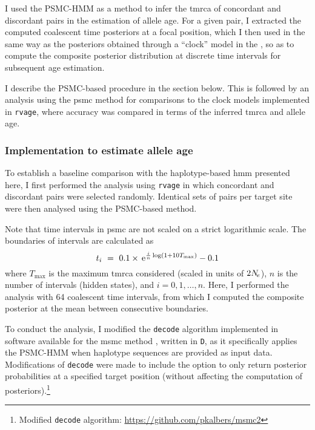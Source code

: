 I used the PSMC-HMM as a method to infer the \gls{tmrca} of concordant and discordant pairs in the estimation of allele age.
For a given pair, I extracted the computed coalescent time posteriors at a focal position, which I then used in the same way as the posteriors obtained through a ``clock'' model in the , so as to compute the composite posterior distribution at discrete time intervals for subsequent age estimation.

I describe the PSMC-based procedure in the section below.
This is followed by an analysis using the \gls{psmc} method for comparisons to the clock models implemented in \texttt{rvage}, where accuracy was compared in terms of the inferred \gls{tmrca} and allele age.


%
\subsubsection{Implementation to estimate allele age}
%


To establish a baseline comparison with the haplotype-based \gls{hmm} presented here, I first performed the analysis using \texttt{rvage} in which concordant and discordant pairs were selected randomly.
Identical sets of pairs per target site were then analysed using the PSMC-based method.

Note that time intervals in \gls{psmc} are not scaled on a strict logarithmic scale.
The boundaries of intervals are calculated as
\begin{equation}
	t_i~=~0.1\times\,\mathrm{e}^{\frac{i}{n}\log(1 + 10  T_{\max})}-0.1
\end{equation}
where $T_{\max}$ is the maximum \gls{tmrca} considered (scaled in units of $2N_{\!e}$), $n$ is the number of intervals (\ie hidden states), and ${i=0,1,\ldots,n}$.
Here, I performed the analysis with 64 coalescent time intervals, from which I computed the composite posterior at the mean between consecutive boundaries.

To conduct the analysis, I modified the \texttt{decode} algorithm implemented in software available for the \gls{msmc} method \citep{schiffels2014inferring}, written in \texttt{D}, as it specifically applies the PSMC-HMM when  haplotype sequences are provided as input data.
Modifications of \texttt{decode} were made to include the option to only return posterior probabilities at a specified target position (without affecting the computation of posteriors).\footnote{Modified \texttt{decode} algorithm: \url{https://github.com/pkalbers/msmc2} }

